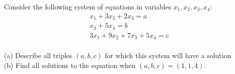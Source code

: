 \begin{question}
	\normalfont
	
	Consider the following system of equations in variables $x_1,x_2,x_3,x_4$:
	\[
	\begin{array}{r}
	x_1 + 3x_2 + 2x_3 = a \\
	x_3 + 5 x_4 = b \\
	3x_1 + 9x_2 + 7x_3 + 5x_4 = c \\
	\end{array}
	\]
	
\noindent (a) Describe all triples $(a,b,c)$ for which this system will have a solution \\


\noindent (b) Find all solutions to the equation when  $(a,b,c)=(1,1,4)$. 
	
	
\end{question}